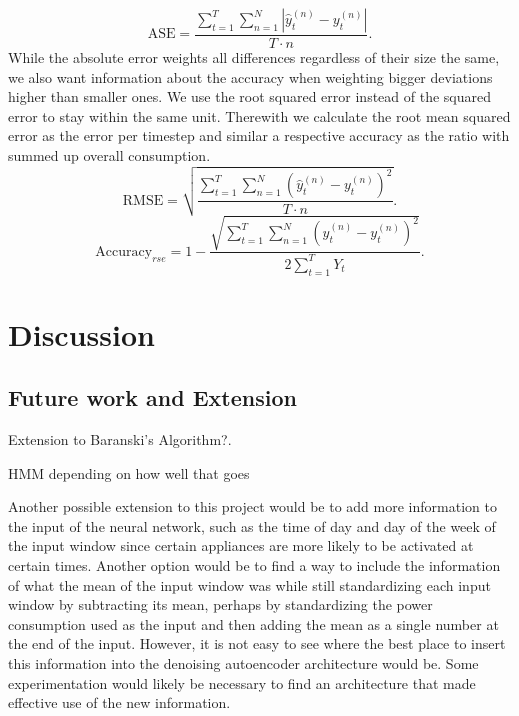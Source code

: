 \documentclass{article}
\begin{document}
\[\textrm{ASE} = \frac{\sum^{T}_{t=1}\sum^{N}_{n=1}|\hat{y}^{(n)}_t-y^{(n)}_t|}{T \cdot n} .  \]
While the absolute error weights all differences regardless of their size the same, we also want information about the accuracy when 
weighting bigger deviations higher than smaller ones. We use the root squared error instead of the squared error 
to stay within the same unit. Therewith we calculate the root mean squared error as the error per timestep and similar a respective 
accuracy as the ratio with summed up overall consumption.
\[\textrm{RMSE} = \sqrt{\frac{\sum^{T}_{t=1}\sum^{N}_{n=1}(\hat{y}^{(n)}_t-y^{(n)}_t)^2}{T \cdot n}} .  \]
\[\textrm{Accuracy}_{rse} = 1- \frac{\sqrt{\sum^{T}_{t=1}\sum^{N}_{n=1}(\hat{y}^{(n)}_t-y^{(n)}_t)^2}}{2 \sum^{T}_{t=1}Y_t} .  \]












\section{Discussion}

\subsection{Future work and Extension}

Extension to Baranski's Algorithm?.

HMM depending on how well that goes

Another possible extension to this project would be to add more information to the input of the neural network, such as the time of day and day of the week of the input window since certain appliances are more likely to be activated at certain times. Another option would be to find a way to include the information of what the mean of the input window was while still standardizing each input window by subtracting its mean\cite{Kelly}, perhaps by standardizing the power consumption used as the input and then adding the mean as a single number at the end of the input. However, it is not easy to see where the best place to insert this information into the denoising autoencoder architecture would be. Some experimentation would likely be necessary to find an architecture that made effective use of the new information.




\end{document}
